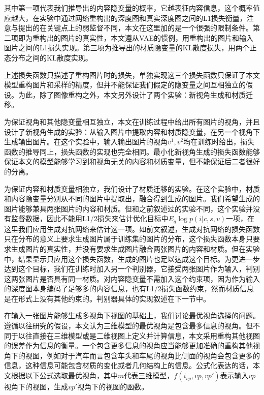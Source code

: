 \documentclass[UTF8,openany,AutoFakeBold,AutoFakeSlant,cs4size]{ctexbook}
\begin{document}
其中第一项代表我们推导出的内容隐变量的概率，它越表征内容信息，这个概率值应越大，在实验中通过网络重构出的深度图和真实深度图之间的L1损失衡量，注意与\cite{Wu2019DisentanglingCA}提出的在关键点上的弱监督不同，本文在这里加的是一个很强的限制条件。第二项即为重构出的图片的真实性，本文遵从VAE的惯例，用重构出的图片和输入图片之间的L1损失实现。第三项为推导出的材质隐变量的KL散度损失，用两个正态分布之间的KL散度实现。

上述损失函数只描述了重构图片时的损失，单独实现这三个损失函数只保证了本文模型重构图片和采样的精度，但并不能保证我们假定的隐变量之间互相独立的假设。为此，除了图像重构之外，本文另外设计了两个实验：新视角生成和材质迁移。

为保证视角和其他隐变量相互独立，本文在训练过程中给出所有图片的视角，并且设计了新视角生成的实验：从输入图片中提取内容和材质隐变量，在另一个视角下生成输出图片。在这个实验中，输入输出图片的视角$v^{1}, v^{2}​$均在训练时给出，损失函数的推导同上，损失函数的实现也完全相同。最小化新视角生成的损失函数能够保证本文的模型能够学习到和视角无关的内容和材质变量，但不能保证后二者很好的分离。

为保证内容和材质变量相独立，我们设计了材质迁移的实验。在这个实验中，材质和内容隐变量分别从不同的图片中提取出，融合得到生成的图片。我们希望生成的图片能够兼具两张图片的内容和材质。但和之前叙述过的实验不同，这个实验并没有监督数据，因此不能用L1/2损失来估计优化目标中$E_{q} \log p(i | c, s, v)$一项，在这里我们应用生成对抗网络来估计这一项。如前文叙述，生成对抗网络的损失函数只在分布的意义上要求生成图片属于训练集的图片的分布，这个损失函数本身只要求生成图片的真实性，并没有要求生成图片融合两张图片的内容和材质。但在实验中，结果显示只应用这个损失函数，生成的图片也足以达成这个目标。为更进一步达到这个目标，我们在训练时加入另一个判别器，它接受两张图片作为输入，判别这两张图片是否具有同一材质。对内容隐变量不需加入这个约束项，因为作为输入的深度图本身编码了足够多的内容信息，也有L1/2损失函数约束，然而材质信息是在形式上没有其他约束的。判别器具体的实现叙述在下一节中。

在输入一张图片能够生成多视角下视图的基础上，我们讨论最优视角选择的问题。遵循以往研究的假设，本文认为三维模型的最优视角是包含最多信息的视角。但不同于以往直接在三维模型或是二维视图上定义并计算信息，本文采用重构其他视图的误差作为信息的衡量。一个包含更多信息的视角应当能够更加准确的重构其他视角下的视图，例如对于汽车而言包含车头和车尾的视角比侧面的视角会包含更多的信息，这种信息可能包含材质的变化或者几何结构上的信息。公式化表达的话，本文根据以下公式选取最优视角，其中$m$代表三维模型，$f(i_{vp}, vp, vp')$表示输入$vp$视角下的视图，生成$vp'$视角下的视图的函数。
\end{document}
